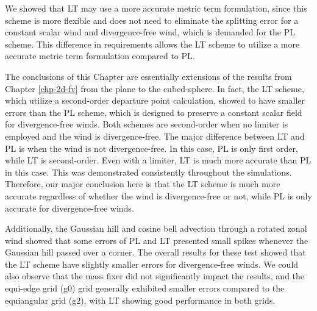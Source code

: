 We showed that LT may use a more accurate metric term formulation, since this scheme is more flexible and does not need to eliminate the splitting error for a constant
scalar wind and divergence-free wind, which is demanded for the PL scheme.
This difference in requirements allows the LT scheme to utilize a more accurate metric term formulation compared to PL.


The conclusions of this Chapter are essentially extensions of the results from Chapter \ref{chp-2d-fv} from the plane to the cubed-sphere.
In fact, the LT scheme, which utilize a second-order departure point calculation, showed to have smaller errors than the PL scheme,
which is designed to preserve a constant scalar field for divergence-free winds.
Both schemes are second-order when no limiter is employed and the wind is divergence-free.
The major difference between LT and PL is when the wind is not divergence-free.
In this case, PL is only first order, while LT is second-order. Even with a limiter, LT is much more accurate than PL in this case.
This was demonstrated consistently throughout the simulations.
Therefore, our major conclusion here is that the LT scheme is much more accurate regardless of whether the wind is divergence-free or not, while 
PL is only accurate for divergence-free winds.

Additionally, the Gaussian hill and cosine bell advection through a rotated zonal wind showed 
that some errors of PL and LT presented small spikes whenever the Gaussian hill passed over a corner.
The overall results for these test showed that the LT scheme have slightly smaller errors for divergence-free winds.
We could also observe that the mass fixer did not significantly impact the results,
and the equi-edge grid (g0) grid generally exhibited smaller errors compared to the equiangular grid (g2), with LT showing good performance in both grids.
